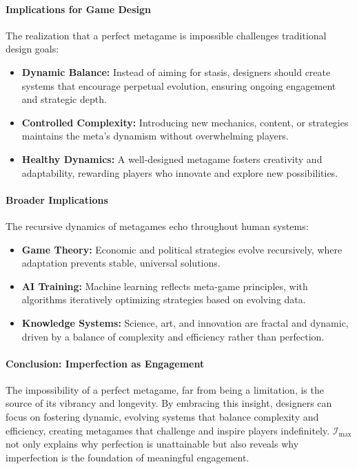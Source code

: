 \documentclass[12pt]{article}
\begin{document}
\paragraph{Implications for Game Design}
The realization that a perfect metagame is impossible challenges traditional design goals:
\begin{itemize}
    \item \textbf{Dynamic Balance:} Instead of aiming for stasis, designers should create systems that encourage perpetual evolution, ensuring ongoing engagement and strategic depth.
    \item \textbf{Controlled Complexity:} Introducing new mechanics, content, or strategies maintains the meta’s dynamism without overwhelming players.
    \item \textbf{Healthy Dynamics:} A well-designed metagame fosters creativity and adaptability, rewarding players who innovate and explore new possibilities.
\end{itemize}

\paragraph{Broader Implications}
The recursive dynamics of metagames echo throughout human systems:
\begin{itemize}
    \item \textbf{Game Theory:} Economic and political strategies evolve recursively, where adaptation prevents stable, universal solutions.
    \item \textbf{AI Training:} Machine learning reflects meta-game principles, with algorithms iteratively optimizing strategies based on evolving data.
    \item \textbf{Knowledge Systems:} Science, art, and innovation are fractal and dynamic, driven by a balance of complexity and efficiency rather than perfection.
\end{itemize}

\paragraph{Conclusion: Imperfection as Engagement}
The impossibility of a perfect metagame, far from being a limitation, is the source of its vibrancy and longevity. By embracing this insight, designers can focus on fostering dynamic, evolving systems that balance complexity and efficiency, creating metagames that challenge and inspire players indefinitely. \(\mathcal{I}_{\text{max}}\) not only explains why perfection is unattainable but also reveals why imperfection is the foundation of meaningful engagement.
\end{document}
